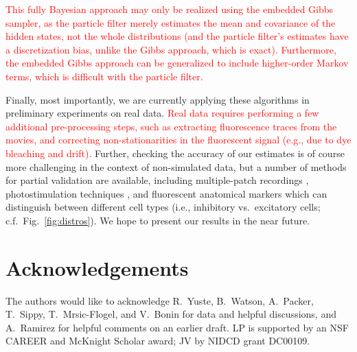 \documentclass[aoas,preprint]{imsart}
\providecommand{\tr}[1]{\textcolor{red}{#1}}
\begin{document}
\tr{This fully Bayesian approach may only be realized using the embedded Gibbs sampler, as the particle filter merely estimates the mean and covariance of the hidden states, not the whole distributions (and the particle filter's estimates have a discretization bias, unlike the Gibbs approach, which is exact).  Furthermore, the embedded Gibbs approach can be generalized to include higher-order Markov terms, which is difficult with the particle filter.}

Finally, most importantly, we are currently applying these algorithms in preliminary experiments on real data. \tr{Real data requires performing a few additional pre-processing steps, such as extracting fluorescence traces from the movies, and correcting non-stationarities in the fluorescent signal (e.g., due to dye bleaching and drift).} Further, checking the accuracy of our estimates is of course more challenging in the context of non-simulated data, but a number of methods for partial validation are available, including multiple-patch recordings \cite{Song2005}, photostimulation techniques \cite{Vovan07}, and fluorescent anatomical markers which can distinguish between different cell types \cite{Meyer02} (i.e., inhibitory vs.\ excitatory cells; c.f.\ Fig.~\ref{fig:distros}). We hope to present our results in the near future.


\section*{Acknowledgements}
The authors would like to acknowledge R.\ Yuste, B.\ Watson, A.\
Packer, T.\ Sippy, T.\ Mrsic-Flogel, and V.\ Bonin for data and
helpful discussions, and A.\ Ramirez for helpful comments on an
earlier draft.  LP is supported by an NSF CAREER and McKnight Scholar
award; JV by NIDCD grant DC00109.


% 

\end{document}

